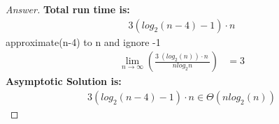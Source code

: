 \documentclass[11pt]{article}
\theoremstyle{definition}
\theoremstyle{definition}
\theoremstyle{definition}
\begin{document}
\begin{proof}[Answer]
\textbf{Total run time is:\\}
\begin{align*}
3 (log_2\left(n-4\right)-1) \cdot n
\end{align*}
approximate(n-4) to n and ignore -1\\
\begin{align*}
\lim _{n\to \infty }\left(\frac{3\:\left(log_2\left(n\right)\right)\cdot n\:}{nlog_2n}\right) &= 3
\end{align*}
\textbf{Asymptotic Solution is:\\}
\begin{align*}
3 (log_2\left(n-4\right)-1) \cdot n \in  \Theta(nlog_2(n))
\end{align*}
\end{proof}




\end{document}
